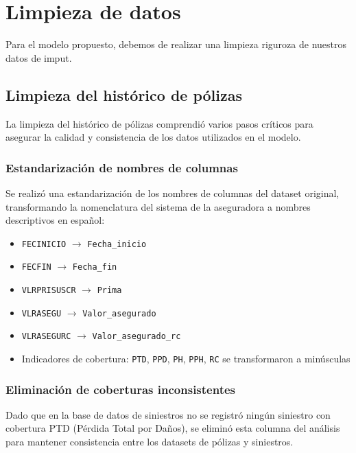 \section{Limpieza de datos}

Para el modelo propuesto, debemos de realizar una limpieza riguroza de nuestros datos de imput.

\subsection{Limpieza del histórico de pólizas}

La limpieza del histórico de pólizas comprendió varios pasos críticos para asegurar la calidad y consistencia de los datos utilizados en el modelo.

\subsubsection{Estandarización de nombres de columnas}

Se realizó una estandarización de los nombres de columnas del dataset original, transformando la nomenclatura del sistema de la aseguradora a nombres descriptivos en español:

\begin{itemize}
    \item \texttt{FECINICIO} $\rightarrow$ \texttt{Fecha\_inicio}
    \item \texttt{FECFIN} $\rightarrow$ \texttt{Fecha\_fin}
    \item \texttt{VLRPRISUSCR} $\rightarrow$ \texttt{Prima}
    \item \texttt{VLRASEGU} $\rightarrow$ \texttt{Valor\_asegurado}
    \item \texttt{VLRASEGURC} $\rightarrow$ \texttt{Valor\_asegurado\_rc}
    \item Indicadores de cobertura: \texttt{PTD}, \texttt{PPD}, \texttt{PH}, \texttt{PPH}, \texttt{RC} se transformaron a minúsculas
\end{itemize}

\subsubsection{Eliminación de coberturas inconsistentes}

Dado que en la base de datos de siniestros no se registró ningún siniestro con cobertura PTD (Pérdida Total por Daños), se eliminó esta columna del análisis para mantener consistencia entre los datasets de pólizas y siniestros.

